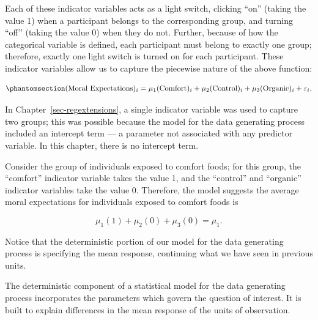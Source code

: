 \documentclass[
  letterpaper,
  DIV=11,
  numbers=noendperiod]{scrreprt}
\theoremstyle{definition}
\theoremstyle{definition}
\theoremstyle{plain}
\theoremstyle{remark}
\begin{document}
Each of these indicator variables acts as a light switch, clicking
``on'' (taking the value 1) when a participant belongs to the
corresponding group, and turning ``off'' (taking the value 0) when they
do not. Further, because of how the categorical variable is defined,
each participant must belong to exactly one group; therefore, exactly
one light switch is turned on for each participant. These indicator
variables allow us to capture the piecewise nature of the above
function:

\begin{equation}\phantomsection\label{eq-anovamodel-model}{
(\text{Moral Expectations})_i = \mu_1 (\text{Comfort})_i + \mu_2 (\text{Control})_i + \mu_3 (\text{Organic})_i + \varepsilon_i.
}\end{equation}

\begin{tcolorbox}[enhanced jigsaw, colbacktitle=quarto-callout-note-color!10!white, colback=white, left=2mm, title=\textcolor{quarto-callout-note-color}{\faInfo}\hspace{0.5em}{Note}, toptitle=1mm, leftrule=.75mm, breakable, bottomrule=.15mm, arc=.35mm, rightrule=.15mm, toprule=.15mm, coltitle=black, opacityback=0, colframe=quarto-callout-note-color-frame, opacitybacktitle=0.6, bottomtitle=1mm, titlerule=0mm]

In Chapter~\ref{sec-regextensions}, a single indicator variable was used
to capture two groups; this was possible because the model for the data
generating process included an intercept term --- a parameter not
associated with any predictor variable. In this chapter, there is no
intercept term.

\end{tcolorbox}

Consider the group of individuals exposed to comfort foods; for this
group, the ``comfort'' indicator variable takes the value 1, and the
``control'' and ``organic'' indicator variables take the value 0.
Therefore, the model suggests the average moral expectations for
individuals exposed to comfort foods is

\[\mu_1 (1) + \mu_2 (0) + \mu_3 (0) = \mu_1.\]

Notice that the deterministic portion of our model for the data
generating process is specifying the mean response, continuing what we
have seen in previous units.

\begin{tcolorbox}[enhanced jigsaw, colbacktitle=quarto-callout-tip-color!10!white, colback=white, left=2mm, title=\textcolor{quarto-callout-tip-color}{\faLightbulb}\hspace{0.5em}{Big Idea}, toptitle=1mm, leftrule=.75mm, breakable, bottomrule=.15mm, arc=.35mm, rightrule=.15mm, toprule=.15mm, coltitle=black, opacityback=0, colframe=quarto-callout-tip-color-frame, opacitybacktitle=0.6, bottomtitle=1mm, titlerule=0mm]

The deterministic component of a statistical model for the data
generating process incorporates the parameters which govern the question
of interest. It is built to explain differences in the mean response of
the units of observation.

\end{tcolorbox}
\end{document}
